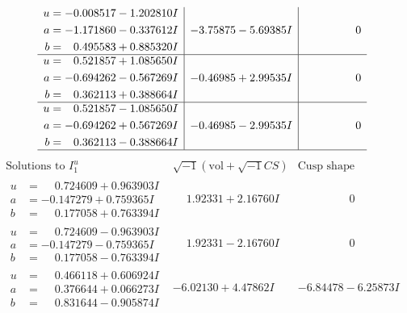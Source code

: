 \documentclass[1p]{elsarticle_modified}
\theoremstyle{definition}
\newcommand{\I}{\sqrt{-1}}
\begin{document}
$$\begin{array}{c|c|c}
\begin{aligned}
u &= -0.008517 - 1.202810 I \\
a &= -1.171860 - 0.337612 I \\
b &= \phantom{-}0.495583 + 0.885320 I\end{aligned}
 & -3.75875 - 5.69385 I & \phantom{-0.000000 } 0 \\ \hline\begin{aligned}
u &= \phantom{-}0.521857 + 1.085650 I \\
a &= -0.694262 - 0.567269 I \\
b &= \phantom{-}0.362113 + 0.388664 I\end{aligned}
 & -0.46985 + 2.99535 I & \phantom{-0.000000 } 0 \\ \hline\begin{aligned}
u &= \phantom{-}0.521857 - 1.085650 I \\
a &= -0.694262 + 0.567269 I \\
b &= \phantom{-}0.362113 - 0.388664 I\end{aligned}
 & -0.46985 - 2.99535 I & \phantom{-0.000000 } 0\\
 \hline 
 \end{array}$$\newpage$$\begin{array}{c|c|c}  
\text{Solutions to }I^u_{1}& \I (\text{vol} + \sqrt{-1}CS) & \text{Cusp shape}\\
 \hline 
\begin{aligned}
u &= \phantom{-}0.724609 + 0.963903 I \\
a &= -0.147279 + 0.759365 I \\
b &= \phantom{-}0.177058 + 0.763394 I\end{aligned}
 & \phantom{-}1.92331 + 2.16760 I & \phantom{-0.000000 } 0 \\ \hline\begin{aligned}
u &= \phantom{-}0.724609 - 0.963903 I \\
a &= -0.147279 - 0.759365 I \\
b &= \phantom{-}0.177058 - 0.763394 I\end{aligned}
 & \phantom{-}1.92331 - 2.16760 I & \phantom{-0.000000 } 0 \\ \hline\begin{aligned}
u &= \phantom{-}0.466118 + 0.606924 I \\
a &= \phantom{-}0.376644 + 0.066273 I \\
b &= \phantom{-}0.831644 - 0.905874 I\end{aligned}
 & -6.02130 + 4.47862 I & -6.84478 - 6.25873 I \\ \hline\begin{aligned}

\end{aligned}
\end{array}$$
\end{document}
